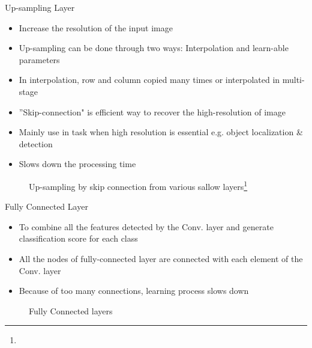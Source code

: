 \documentclass[10pt]{beamer}
\begin{document}
\begin{frame}{Up-sampling Layer}
    \begin{itemize}
        \item Increase the resolution of the input image
        \item Up-sampling can be done through two ways: Interpolation and learn-able parameters
        \item In interpolation, row and column copied many times or interpolated in multi-stage 
        \item ''Skip-connection" is efficient way to recover the high-resolution of image
        \item Mainly use in task when high resolution is essential e.g. object localization \& detection
        \item Slows down the processing time 
    \end{itemize}

     \begin{figure}
        \centering
        \caption{Up-sampling by skip connection from various sallow layers\footnote[frame]{}}
   \end{figure}      
\end{frame}

\begin{frame}{Fully Connected Layer}
    \begin{itemize}
        \item To combine all the features detected by the Conv. layer and generate classification score for each class
        \item All the nodes of fully-connected layer are connected with each element of the Conv. layer
        \item Because of too many connections, learning process slows down 
    \end{itemize}
    
    \begin{figure}
        \centering
         \caption{Fully Connected layers}
    \end{figure}    
\end{frame}
\end{document}
